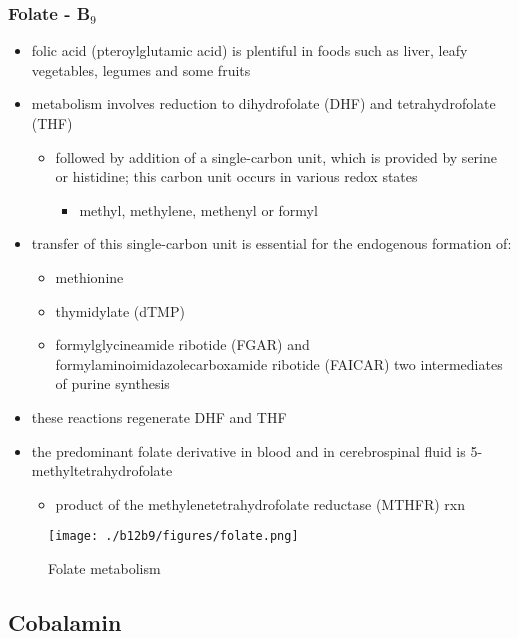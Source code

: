 \documentclass{scrartcl}
\begin{document}
\subsubsection{Folate - B\(_{\text{9}}\)}
\label{sec:orgcefd40c}
\begin{itemize}
\item folic acid (pteroylglutamic acid) is plentiful in foods such as
liver, leafy vegetables, legumes and some fruits
\item metabolism involves reduction to dihydrofolate (DHF) and
tetrahydrofolate (THF)
\begin{itemize}
\item followed by addition of a single-carbon unit, which is provided by
serine or histidine; this carbon unit occurs in various redox
states
\begin{itemize}
\item methyl, methylene, methenyl or formyl
\end{itemize}
\end{itemize}
\item transfer of this single-carbon unit is essential for the endogenous
formation of:
\begin{itemize}
\item methionine
\item thymidylate (dTMP)
\item formylglycineamide ribotide (FGAR) and
formylaminoimidazolecarboxamide ribotide (FAICAR) two
intermediates of purine synthesis
\end{itemize}
\item these reactions regenerate DHF and THF
\item the predominant folate derivative in blood and in cerebrospinal
fluid is 5-methyltetrahydrofolate
\begin{itemize}
\item product of the methylenetetrahydrofolate reductase (MTHFR) rxn
\end{itemize}
\end{itemize}

\begin{figure}[htbp]
\centering
\texttt{[image: ./b12b9/figures/folate.png]}
\caption{\label{fig:org8b9c9d4}
Folate metabolism}
\end{figure}

\subsection{Cobalamin}
\label{sec:orgdc482c3}
\end{document}
